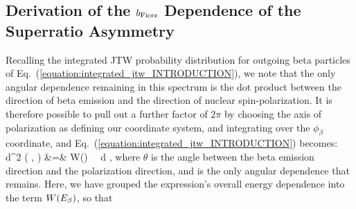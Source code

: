 \subsection{Derivation of the $b_{\mathrm{Fierz}}$ Dependence of the Superratio Asymmetry}
\label{appendix:superratio}
%
Recalling the integrated JTW probability distribution for outgoing beta particles of Eq.~(\ref{equation:integrated_jtw_INTRODUCTION}), 
\note[tag]{}
we note that the only angular dependence remaining in this spectrum is the dot product between the direction of beta emission and the direction of nuclear spin-polarization.  It is therefore possible to pull out a further factor of $2\pi$ by choosing the axis of polarization as defining our coordinate system, and integrating over the $\phi_\beta$ coordinate, and Eq.~(\ref{equation:integrated_jtw_INTRODUCTION}) becomes:
\bea
	\textrm{d}^2 \Gamma  ( \Ebeta, \theta ) 
	&=&
	W(\Ebeta)  \, \dEe \, \textrm{d} \theta , 
\eea
where $\theta$ is the angle between the beta emission direction and the polarization direction, and is the only angular dependence that remains.  Here, we have grouped the expression's overall energy dependence into the term $W(E_{\beta})$, so that
